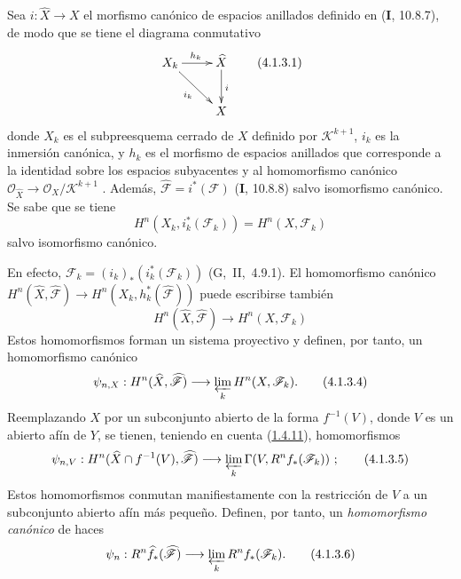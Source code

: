 \begin{env}[4.1.3]
\label{III.4.1.3}
\label{III.4.1.3-fr}
Sea $i:\widehat X\to X$ el morfismo canónico de espacios anillados definido en (\textbf{I}, 10.8.7), de modo que se tiene el diagrama conmutativo \[
\xymatrix{
X_k\ar[r]^{h_k}\ar[dr]_{i_k}&\widehat X\ar[d]^i\\
&X
}
\tag{4.1.3.1}\label{III.4.1.3.1-fr}
\]
donde $X_k$ es el subpreesquema cerrado de $X$ definido por
$\mathcal K^{k+1}$, $i_k$ es la inmersión canónica, y $h_k$ es el
morfismo de espacios anillados que corresponde a la identidad sobre
los espacios subyacentes y al homomorfismo canónico
$\mathcal O_{\widehat X}\to\mathcal O_X/\mathcal K^{k+1}$
.
Además,
$\widehat{\mathcal F}=i^*(\mathcal F)$ (\textbf{I}, 10.8.8) salvo isomorfismo canónico. Se sabe que se tiene \[
H^n(X_k,i_k^*(\mathcal F_k))=H^n(X,\mathcal F_k)
\tag{4.1.3.2}\label{III.4.1.3.2-fr}
\]
salvo isomorfismo canónico.


En efecto,
$\mathcal F_k=(i_k)_*(i_k^*(\mathcal F_k))$
(G,~II,~4.9.1).
El homomorfismo canónico
$H^n(\widehat X,\widehat{\mathcal F})\to
H^n(X_k,h_k^*(\widehat{\mathcal F}))$
 puede escribirse también
\[
H^n(\widehat X,\widehat{\mathcal F})\longrightarrow H^n(X,\mathcal F_k)
\tag{4.1.3.3}\label{III.4.1.3.3-fr}
\]
Estos homomorfismos forman un sistema proyectivo y definen, por tanto,
un homomorfismo canónico
\[
\psi_{n,X}:H^n(\widehat X,\widehat{\mathcal F})
\longrightarrow\varprojlim_kH^n(X,\mathcal F_k).
\tag{4.1.3.4}\label{III.4.1.3.4-fr}
\]
Reemplazando $X$ por un subconjunto abierto de la forma $f^{-1}(V)$,
donde $V$ es un abierto afín de $Y$, se tienen, teniendo en cuenta (\hyperref[III.1.4.11-fr]{1.4.11}), homomorfismos \[
\psi_{n,V}:H^n(\widehat X\cap f^{-1}(V),\widehat{\mathcal F})
\longrightarrow\varprojlim_k\Gamma(V,R^nf_*(\mathcal F_k))~;
\tag{4.1.3.5}\label{III.4.1.3.5-fr}
\]
Estos homomorfismos conmutan manifiestamente con la restricción de $V$
a un subconjunto abierto afín más pequeño.
Definen, por tanto, un \emph{homomorfismo canónico} de haces
\[
\psi_n:R^n\widehat f_*(\widehat{\mathcal F})
\longrightarrow\varprojlim_kR^nf_*(\mathcal F_k).
\tag{4.1.3.6}\label{III.4.1.3.6-fr}
\]
\end{env}

